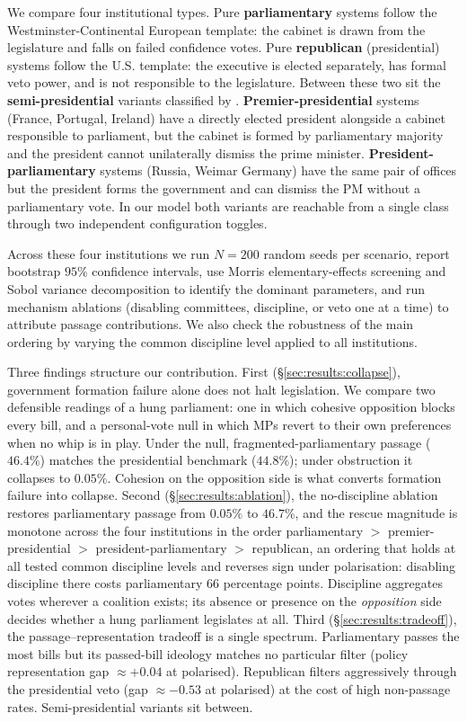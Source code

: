 \documentclass[11pt]{article}
\begin{document}
We compare four institutional types. Pure \textbf{parliamentary} systems
follow the Westminster-Continental European template: the cabinet is drawn
from the legislature and falls on failed confidence votes. Pure
\textbf{republican} (presidential) systems follow the U.S. template: the
executive is elected separately, has formal veto power, and is not
responsible to the legislature. Between these two sit the
\textbf{semi-presidential} variants classified by \citet{shugart1992}.
\textbf{Premier-presidential} systems (France, Portugal, Ireland) have a
directly elected president alongside a cabinet responsible to parliament,
but the cabinet is formed by parliamentary majority and the president cannot
unilaterally dismiss the prime minister. \textbf{President-parliamentary}
systems (Russia, Weimar Germany) have the same pair of offices but the
president forms the government and can dismiss the PM without a parliamentary
vote. In our model both variants are reachable from a single class through
two independent configuration toggles.

Across these four institutions we run $N=200$ random seeds per scenario,
report bootstrap $95\%$ confidence intervals, use Morris elementary-effects
screening and Sobol variance decomposition to identify the dominant
parameters, and run mechanism ablations (disabling committees, discipline,
or veto one at a time) to attribute passage contributions. We also check
the robustness of the main ordering by varying the common discipline level
applied to all institutions.

Three findings structure our contribution. First (\S\ref{sec:results:collapse}),
government formation failure alone does not halt legislation. We compare two
defensible readings of a hung parliament: one in which cohesive opposition
blocks every bill, and a personal-vote null in which MPs revert to their own
preferences when no whip is in play. Under the null, fragmented-parliamentary
passage ($46.4\%$) matches the presidential benchmark ($44.8\%$); under
obstruction it collapses to $0.05\%$. Cohesion on the opposition side is
what converts formation failure into collapse. Second
(\S\ref{sec:results:ablation}), the no-discipline ablation restores parliamentary
passage from $0.05\%$ to $46.7\%$, and the rescue magnitude is monotone
across the four institutions in the order parliamentary $>$
premier-presidential $>$ president-parliamentary $>$ republican, an ordering
that holds at all tested common discipline levels and reverses sign under
polarisation: disabling discipline there costs parliamentary $66$ percentage
points. Discipline aggregates votes wherever a coalition exists; its absence
or presence on the \emph{opposition} side decides whether a hung parliament
legislates at all. Third (\S\ref{sec:results:tradeoff}), the passage--representation
tradeoff is a single spectrum. Parliamentary passes the most bills but its
passed-bill ideology matches no particular filter (policy representation gap
$\approx +0.04$ at polarised). Republican filters aggressively through the
presidential veto (gap $\approx -0.53$ at polarised) at the cost of high
non-passage rates. Semi-presidential variants sit between.
\end{document}
